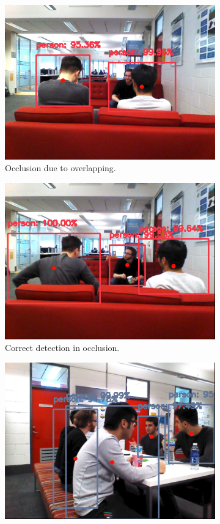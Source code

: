\begin{figure}[H]
    \begin{subfigure}{.5\textwidth}
        \centering
        \includegraphics[width=.9\linewidth]{images/chapter6_occlusion_seated.png}
        \caption{Occlusion due to overlapping.}
        \label{2a}
	\end{subfigure}
    \begin{subfigure}{.5\textwidth}
        \centering
        \includegraphics[width=.9\linewidth]{images/chapter6_occlusion_seated_good.png}
        \caption{Correct detection in occlusion.}
        \label{2b}
	\end{subfigure}
    \begin{subfigure}{.5\textwidth}
        \centering
        \includegraphics[width=.9\linewidth]{images/chapter6_occlusion_table_back.png}

\end{subfigure}
\end{figure}
